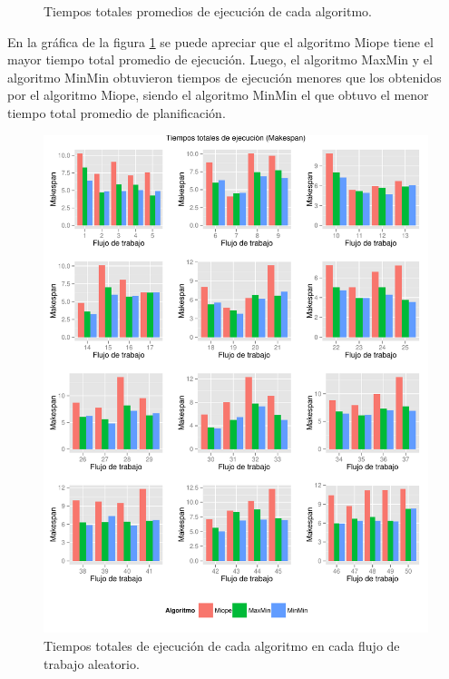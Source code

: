 \begin{figure}
\begin{center}
\end{center}
\caption{Tiempos totales promedios de ejecución de cada algoritmo.}
\label{fig:tiempos_promedios}
\end{figure}

En la gráfica de la figura \ref{fig:tiempos_promedios} se puede apreciar que el algoritmo Miope tiene el mayor tiempo total promedio de ejecución. Luego, el algoritmo MaxMin y el algoritmo MinMin obtuvieron tiempos de ejecución menores que los obtenidos por el algoritmo Miope, siendo el algoritmo MinMin el que obtuvo el menor tiempo total promedio de planificación.

\begin{figure}
\begin{center}
  \includegraphics[width=1.0\textwidth]{imagenes/results.pdf}
\end{center}
\caption{Tiempos totales de ejecución de cada algoritmo en cada flujo de trabajo aleatorio.}
\label{fig:tiempos_totales}
\end{figure}

